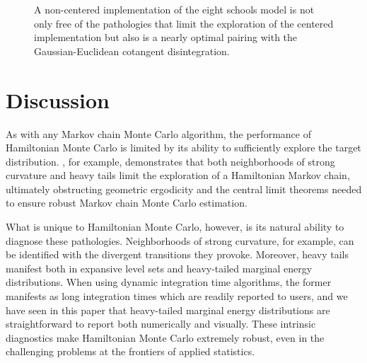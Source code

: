 \documentclass[stslayout]{imsart}
\begin{document}
\begin{figure}
\centering
{}
\caption{A non-centered implementation of the eight schools model is
not only free of the pathologies that limit the exploration of the centered
implementation but also is a nearly optimal pairing with the 
Gaussian-Euclidean cotangent disintegration.}
\label{fig:energy_schools_ncp_exp}
\end{figure}

\section{Discussion}

As with any Markov chain Monte Carlo algorithm, the performance of 
Hamiltonian Monte Carlo is limited by its ability to sufficiently explore 
the target distribution.  \cite{LivingstoneEtAl:2016},
for example, demonstrates that both neighborhoods of strong curvature 
and heavy tails limit the exploration of a Hamiltonian Markov chain,
ultimately obstructing geometric ergodicity and the central limit theorems 
needed to ensure robust Markov chain Monte Carlo estimation.

What is unique to Hamiltonian Monte Carlo, however, is its natural
ability to diagnose these pathologies.  Neighborhoods of strong
curvature, for example, can be identified with the divergent transitions
they provoke.  Moreover, heavy tails manifest both in expansive level 
sets and heavy-tailed marginal energy distributions.  When using
dynamic integration time algorithms, the former manifests as long
integration times which are readily reported to users, and we have
seen in this paper that heavy-tailed marginal energy distributions
are straightforward to report both numerically and visually.  These
intrinsic diagnostics make Hamiltonian Monte Carlo extremely
robust, even in the challenging problems at the frontiers of applied statistics.
\end{document}
